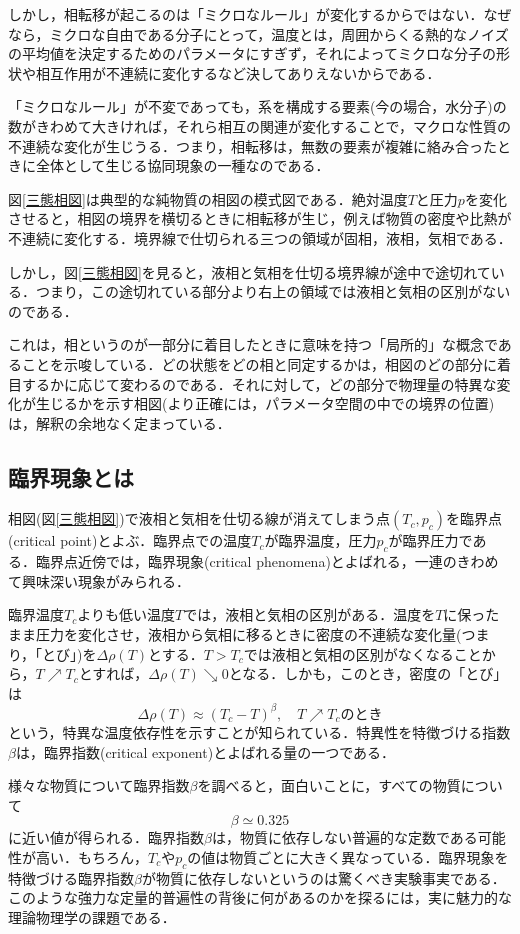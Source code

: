 \documentclass[a4paper,11pt]{jsreport}
\begin{document}
しかし，相転移が起こるのは「ミクロなルール」が変化するからではない．なぜなら，ミクロな自由である分子にとって，温度とは，周囲からくる熱的なノイズの平均値を決定するためのパラメータにすぎず，それによってミクロな分子の形状や相互作用が不連続に変化するなど決してありえないからである．\par
「ミクロなルール」が不変であっても，系を構成する要素(今の場合，水分子)の数がきわめて大きければ，それら相互の関連が変化することで，マクロな性質の不連続な変化が生じうる．つまり，相転移は，無数の要素が複雑に絡み合ったときに全体として生じる協同現象の一種なのである．\par
図\ref{三態相図}は典型的な純物質の相図の模式図である．絶対温度$T$と圧力$p$を変化させると，相図の境界を横切るときに相転移が生じ，例えば物質の密度や比熱が不連続に変化する．境界線で仕切られる三つの領域が固相，液相，気相である．\par
しかし，図\ref{三態相図}を見ると，液相と気相を仕切る境界線が途中で途切れている．つまり，この途切れている部分より右上の領域では液相と気相の区別がないのである．\par
これは，相というのが一部分に着目したときに意味を持つ「局所的」な概念であることを示唆している．どの状態をどの相と同定するかは，相図のどの部分に着目するかに応じて変わるのである．それに対して，どの部分で物理量の特異な変化が生じるかを示す相図(より正確には，パラメータ空間の中での境界の位置)は，解釈の余地なく定まっている．\par

\subsection{臨界現象とは}
相図(図\ref{三態相図})で液相と気相を仕切る線が消えてしまう点$(T_c,p_c)$を臨界点(critical point)とよぶ．臨界点での温度$T_c$が臨界温度，圧力$p_c$が臨界圧力である．臨界点近傍では，臨界現象(critical phenomena)とよばれる，一連のきわめて興味深い現象がみられる．\par
臨界温度$T_c$よりも低い温度$T$では，液相と気相の区別がある．温度を$T$に保ったまま圧力を変化させ，液相から気相に移るときに密度の不連続な変化量(つまり，「とび」)を$\Delta \rho(T)$とする．$T>T_c$では液相と気相の区別がなくなることから，$T \nearrow T_c$とすれば，$\Delta \rho(T) \searrow 0$となる．しかも，このとき，密度の「とび」は
\begin{equation}
  \Delta \rho(T) \approx (T_c -T)^{\beta}, \quad T \nearrow T_c \text{のとき}
\end{equation}
という，特異な温度依存性を示すことが知られている．特異性を特徴づける指数$\beta$は，臨界指数(critical exponent)とよばれる量の一つである．\par
様々な物質について臨界指数$\beta$を調べると，面白いことに，すべての物質について
\begin{equation}
  \beta \simeq 0.325
\end{equation}
に近い値が得られる．臨界指数$\beta$は，物質に依存しない普遍的な定数である可能性が高い．もちろん，$T_c$や$p_c$の値は物質ごとに大きく異なっている．臨界現象を特徴づける臨界指数$\beta$が物質に依存しないというのは驚くべき実験事実である．このような強力な定量的普遍性の背後に何があるのかを探るには，実に魅力的な理論物理学の課題である．
\end{document}
